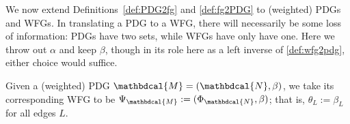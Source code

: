 \documentclass[letterpaper]{article} %
\theoremstyle{plain}
\theoremstyle{definition}
\theoremstyle{remark}
\newcommand{\dg}[1]{\mathbdcal{#1}}
\newcommand{\WFGof}[1]{\Psi_{{#1}}}
\newcommand{\FGof}[1]{\Phi_{{#1}}}
\begin{document}
We now extend Definitions~\ref{def:PDG2fg} and \ref{def:fg2PDG} to
(weighted) PDGs and WFGs.  
In translating a PDG to a WFG, 
there will necessarily be some loss of information: PDGs have two sets, while WFGs have 
only have one. Here we throw out $\alpha$ and keep $\beta$, 
though in its role here as a left inverse of \cref{def:wfg2pdg},
either choice would suffice. 


\begin{defn}
Given a (weighted) PDG $\dg M =
(\dg N, \beta)$, we take its corresponding WFG to be $\WFGof{\dg M} :=
(\FGof{\dg N}, \beta)$; that is, $\theta_L := \beta_L$ for all edges $L$.
\end{defn}
\end{document}
